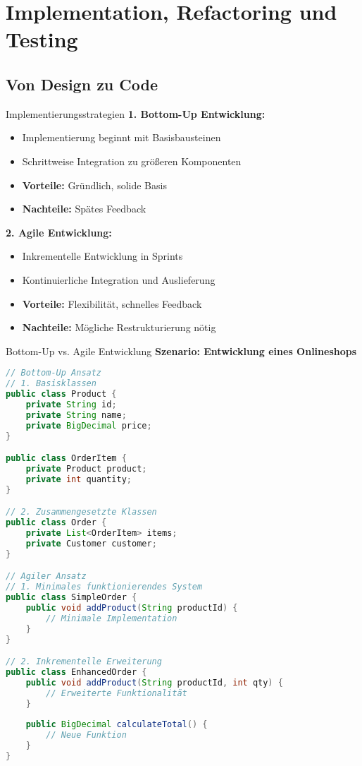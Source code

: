 \section{Implementation, Refactoring und Testing}

\subsection{Von Design zu Code}

\begin{concept}{Implementierungsstrategien}
\textbf{1. Bottom-Up Entwicklung:}
\begin{itemize}
    \item Implementierung beginnt mit Basisbausteinen
    \item Schrittweise Integration zu größeren Komponenten
    \item \textbf{Vorteile:} Gründlich, solide Basis
    \item \textbf{Nachteile:} Spätes Feedback
\end{itemize}

\textbf{2. Agile Entwicklung:}
\begin{itemize}
    \item Inkrementelle Entwicklung in Sprints
    \item Kontinuierliche Integration und Auslieferung
    \item \textbf{Vorteile:} Flexibilität, schnelles Feedback
    \item \textbf{Nachteile:} Mögliche Restrukturierung nötig
\end{itemize}
\end{concept}

\begin{example}{Bottom-Up vs. Agile Entwicklung}
\textbf{Szenario: Entwicklung eines Onlineshops}

\begin{lstlisting}[language=Java]
// Bottom-Up Ansatz
// 1. Basisklassen
public class Product {
    private String id;
    private String name;
    private BigDecimal price;
}

public class OrderItem {
    private Product product;
    private int quantity;
}

// 2. Zusammengesetzte Klassen
public class Order {
    private List<OrderItem> items;
    private Customer customer;
}

// Agiler Ansatz
// 1. Minimales funktionierendes System
public class SimpleOrder {
    public void addProduct(String productId) {
        // Minimale Implementation
    }
}

// 2. Inkrementelle Erweiterung
public class EnhancedOrder {
    public void addProduct(String productId, int qty) {
        // Erweiterte Funktionalität
    }
    
    public BigDecimal calculateTotal() {
        // Neue Funktion
    }
}
\end{lstlisting}
\end{example}

